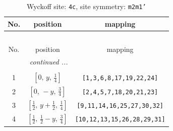 \documentclass[fleqn,8pt]{jsarticle}
\begin{document}
\renewcommand{\arraystretch}{1.2}
\begin{longtable}{ccc}
\caption{Wyckoff site: {\tt 4c}, site symmetry: {\tt m2m1'}}
 \\
 \hline \hline
No. & position & mapping \\ \hline \endfirsthead

\multicolumn{2}{l}{\tablename\ \thetable{}} \\
 \hline \hline
No. & position & mapping \\ \hline \endhead

 \hline \hline
\multicolumn{2}{r}{\footnotesize\it continued ...} \\ \endfoot

 \hline \hline
\multicolumn{2}{r}{} \\ \endlastfoot

1 & $\left[ 0,\, y,\, \frac{1}{4} \right]$ & {\tt [1,3,6,8,17,19,22,24]} \\ \hline
2 & $\left[ 0,\, - y,\, \frac{3}{4} \right]$ & {\tt [2,4,5,7,18,20,21,23]} \\ \hline
3 & $\left[ \frac{1}{2},\, y + \frac{1}{2},\, \frac{1}{4} \right]$ & {\tt [9,11,14,16,25,27,30,32]} \\ \hline
4 & $\left[ \frac{1}{2},\, \frac{1}{2} - y,\, \frac{3}{4} \right]$ & {\tt [10,12,13,15,26,28,29,31]} \\
\end{longtable}
\renewcommand{\arraystretch}{1.2}
\end{document}
